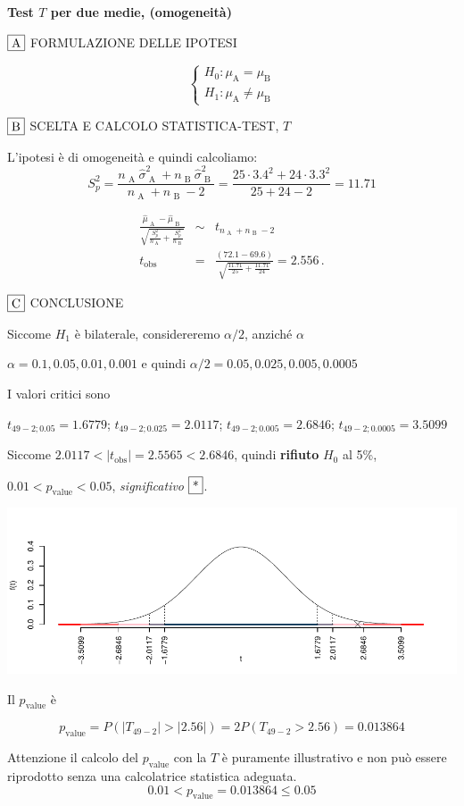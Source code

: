 \documentclass[
  11pt,
]{book}
\theoremstyle{mytheoremstyle}
\theoremstyle{mydefstyle}
\newenvironment{sol}
  {
  \begin{tcolorbox}[enhanced,breakable,arc=0.1mm,boxrule=1pt,colback=white,colframe=iblue,
  title=\bf \fontfamily{lmss}\selectfont \hspace{.5 cm} Soluzione,drop fuzzy shadow]

}{
\end{tcolorbox}
  }
\begin{document}
\begin{sol}
\textbf{Test \(T\) per due medie, (omogeneità)}

\(\fbox{A}\) FORMULAZIONE DELLE IPOTESI

\[\begin{cases}
   H_0: \mu_\text{A} = \mu_\text{B} \\
   H_1: \mu_\text{A} \neq \mu_\text{B} 
   \end{cases}\]

\(\fbox{B}\) SCELTA E CALCOLO STATISTICA-TEST, \(T\)

L'ipotesi è di omogeneità e quindi calcoliamo:\[
   S_p^2=\frac{n_\text{ A }\hat\sigma^2_\text{ A }+n_\text{ B }\hat\sigma^2_\text{ B }}{n_\text{ A }+n_\text{ B }-2} =
   \frac{ 25 \cdot 3.4 ^2+ 24 \cdot 3.3 ^2}{ 25 + 24 -2}= 11.71 
  \]

\begin{eqnarray*}
  \frac{\hat\mu_\text{ A } - \hat\mu_\text{ B }}
  {\sqrt{\frac {S^2_p}{n_\text{ A }}+\frac {S^2_p}{n_\text{ B }}}}&\sim&t_{n_\text{ A }+n_\text{ B }-2}\\
  t_{\text{obs}}
  &=& \frac{ ( 72.1 -  69.6 )} {\sqrt{\frac{ 11.71 }{ 25 }+\frac{ 11.71 }{ 24 }}}
  =   2.556 \, .
  \end{eqnarray*}

\(\fbox{C}\) CONCLUSIONE

Siccome \(H_1\) è bilaterale, considereremo \(\alpha/2\),
anziché \(\alpha\)

\(\alpha=0.1, 0.05, 0.01, 0.001\) e quindi \(\alpha/2=0.05, 0.025, 0.005, 0.0005\)

I valori critici sono

\(t_{49-2;0.05}=1.6779\); \(t_{49-2;0.025}=2.0117\); \(t_{49-2;0.005}=2.6846\); \(t_{49-2;0.0005}=3.5099\)

Siccome \(2.0117<|t_\text{obs}|=2.5565<2.6846\), quindi \textbf{rifiuto} \(H_0\) al 5\%,

\(0.01<p_\text{value}<0.05\), \emph{significativo} \(\fbox{*}\).

\begin{center}\includegraphics{Esami_passati_con_soluzioni_files/figure-latex/2023-71,-1} \end{center}

Il \(p_{\text{value}}\) è

\[ p_{\text{value}} = P(|T_{49-2}|>|2.56|)=2P(T_{49-2}>2.56)=0.013864 \]

Attenzione il calcolo del \(p_\text{value}\) con la \(T\) è puramente illustrativo e non può essere riprodotto senza una calcolatrice statistica adeguata.\[
 0.01 < p_\text{value}= 0.013864 \leq 0.05 
\]

\end{sol}
\end{document}
